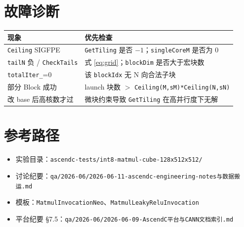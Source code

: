 \documentclass[UTF8,a4paper,11pt]{ctexart}
\begin{document}
\section{故障诊断}

\begin{table}[h]
  \centering
  \small
  \begin{tabular}{lp{8cm}}
    \toprule
    现象 & 优先检查 \\
    \midrule
    \texttt{Ceiling} SIGFPE & \texttt{GetTiling} 是否 $-1$；\texttt{singleCoreM} 是否为 0 \\
    \texttt{tailN} 负 / \texttt{CheckTails} & 式 \eqref{eq:grid}；\texttt{blockDim} 是否大于宏块数 \\
    \texttt{totalIter\_}=0 & 该 \texttt{blockIdx} 无 N 向合法子块 \\
    部分 Block 成功 & launch 块数 $>$ \texttt{Ceiling(M,sM)*Ceiling(N,sN)} \\
    改 base 后高核数才过 & 微块约束导致 \texttt{GetTiling} 在高并行度下无解 \\
    \bottomrule
  \end{tabular}
\end{table}

\section{参考路径}

\begin{itemize}
  \item 实验目录：\texttt{ascendc-tests/int8-matmul-cube-128x512x512/}
  \item 讨论纪要：\texttt{qa/2026-06/2026-06-11-ascendc-engineering-notes与数据搬运.md}
  \item 模板：\texttt{MatmulInvocationNeo}、\texttt{MatmulLeakyReluInvocation}
  \item 平台纪要 §7.5：\texttt{qa/2026-06/2026-06-09-AscendC平台与CANN文档索引.md}
\end{itemize}
\end{document}
